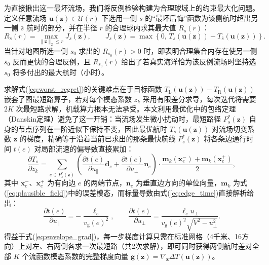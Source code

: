 为直接揪出这一最坏流场，我们将反例检验构建为合理球域上的约束最大化问题。定义任意流场 $\boldsymbol{u}(\boldsymbol{z}) \in \mathcal{U}(r)$ 下选用一侧 $s$ 的“最坏后悔”函数为该侧航时超出另一侧 $\bar{s}$ 航时的部分，并在半径 $r$ 的合理球内求其最大值 $R_s(r)$：
\begin{equation}
R_s(r) = \max_{\|\boldsymbol{z}\|_2 \le r} J_s(\boldsymbol{z}), \qquad J_s(\boldsymbol{z}) = \max\left\{ 0,\, T_s(\boldsymbol{u}(\boldsymbol{z})) - T_{\bar{s}}(\boldsymbol{u}(\boldsymbol{z})) \right\}.
\label{eq:worst_regret}
\end{equation}
当针对地图所选一侧 $s_0$ 求出的 $R_{s_0}(r) > 0$ 时，即表明合理集合内存在使另一侧 $\bar{s}_0$ 反而更快的合理反例，且 $R_{s_0}(r)$ 给出了若真实海洋恰为该反例流场时坚持选 $s_0$ 将多付出的最大航时（小时）。

求解式(\ref{eq:worst_regret})的关键难点在于目标函数 $T_{\text{L}}(\boldsymbol{u}(\boldsymbol{z})) - T_{\text{R}}(\boldsymbol{u}(\boldsymbol{z}))$ 嵌套了图最短路算子，若对每个模态系数 $z_k$ 采用有限差分求导，每次迭代将需要 $2K$ 次最短路求解，机载算力根本无法承受。本文利用最优化中的包络定理（Danskin定理）避免了这一开销：当流场发生微小扰动时，最短路径 $P_s^*(\boldsymbol{z})$ 自身的节点序列在一阶近似下保持不变，因此最优航时 $T_s(\boldsymbol{u}(\boldsymbol{z}))$ 对流场切变系数 $\boldsymbol{z}$ 的梯度，精确等于沿着当前已求出的那条最快航线 $P_s^*(\boldsymbol{z})$ 将各条边通行时间 $t(e)$ 对局部流速的偏导数直接累加：
\begin{equation}
\frac{\partial T_s}{\partial z_k} = \sum_{e \in P_s^*(\boldsymbol{z})} \left( \frac{\partial t(e)}{\partial u_{\parallel}} \boldsymbol{d}_e + \frac{\partial t(e)}{\partial u_{\perp}} \boldsymbol{n}_e \right) \cdot \frac{\boldsymbol{m}_k(\boldsymbol{x}_e^{-}) + \boldsymbol{m}_k(\boldsymbol{x}_e^{+})}{2},
\label{eq:envelope_grad}
\end{equation}
其中 $\boldsymbol{x}_e^{-}$、$\boldsymbol{x}_e^{+}$ 为有向边 $e$ 的两端节点，$\boldsymbol{n}_e$ 为垂直边方向的单位向量，$\boldsymbol{m}_k$ 为式(\ref{eq:plausible_field})中的误差模态，而标量导数由式(\ref{eq:edge_time})直接解析给出：
\begin{equation}
\frac{\partial t(e)}{\partial u_{\parallel}} = -\frac{\ell_e}{v_{\text{g}}(e)^2}, \qquad \frac{\partial t(e)}{\partial u_{\perp}} = \frac{\ell_e u_{\perp}}{v_{\text{g}}(e)^2 \sqrt{V^2 - u_{\perp}^2}}.
\label{eq:edge_deriv}
\end{equation}
得益于式(\ref{eq:envelope_grad})，每一步梯度计算只需在标准网格（4千米、16方向）上对左、右两侧各求一次最短路（共2次求解），即可同时获得两侧航时差对全部 $K$ 个流函数模态系数的完整梯度向量 $\boldsymbol{g}(\boldsymbol{z}) = \nabla_{\boldsymbol{z}} \Delta T(\boldsymbol{u}(\boldsymbol{z}))$。


